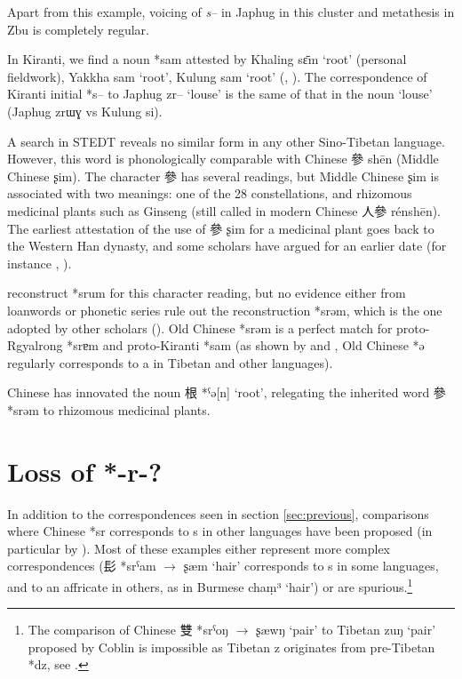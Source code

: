 \documentclass[oldfontcommands,oneside,a4paper,11pt]{article}
\newcommand{\ipa}[1]{{\phon #1}} %
\newcommand{\zh}[1]{{\cn #1}}
\newcommand{\archaic}[4]{\zh{#1} *\ipa{#2} $\rightarrow$ \ipa{#3} `#4'}
\begin{document}
Apart from this example, voicing of \textit{s--} in Japhug in this cluster and metathesis in Zbu is completely regular.

In Kiranti, we find a noun *\ipa{sam} attested by Khaling \ipa{sɛ̄m} `root' (personal fieldwork), Yakkha  \ipa{sam} `root', Kulung \ipa{sam} `root' (\citealt{kongren07yakkha}, \citealt{tolsma06kulung}). The correspondence of Kiranti initial *s--  to Japhug \ipa{zr--} `louse' is the same of that in the noun `louse' (Japhug \ipa{zrɯɣ} vs Kulung \ipa{si}).

A search in STEDT reveals no similar form in any other Sino-Tibetan language. However, this word is phonologically comparable with Chinese \zh{參} \ipa{shēn} (Middle Chinese \ipa{ʂim}). The character  \zh{參} has several readings, but Middle Chinese \ipa{ʂim} is associated with two meanings: one of the 28 constellations, and rhizomous medicinal plants such as Ginseng (still called in modern Chinese \zh{人參} \ipa{rénshēn}). The earliest attestation of the use of \zh{參} \ipa{ʂim} for a medicinal plant goes back to the Western Han dynasty, and some scholars have argued for an earlier date (for instance \citealt{xu11shen}, \citealt{sun92renshen}). 

 \citet[75]{bs14oc} reconstruct *\ipa{srum} for this character reading, but no evidence either from loanwords or phonetic series rule out the reconstruction *\ipa{srəm}, which is the one adopted by other scholars (\citealt{schuessler09minimal}). Old Chinese *\ipa{srəm} is a perfect match for proto-Rgyalrong *\ipa{srɐm} and proto-Kiranti *\ipa{sam} (as shown by \citealt{gong95st} and \citealt{hill12sixvowels}, Old Chinese *\ipa{ə} regularly corresponds to \ipa{a} in Tibetan and other languages).

Chinese has innovated the noun \zh{根} *\ipa{[k]ˁə[n]} `root', %
relegating the inherited word \zh{參} *\ipa{srəm} to rhizomous medicinal plants.

\section{Loss of *-r-?}
In addition to the correspondences seen in section \ref{sec:previous}, comparisons where Chinese *\ipa{sr} corresponds to \ipa{s} in other languages have been proposed (in particular by \citealt{coblin86handlist}). Most of these examples either represent more complex correspondences (\archaic{髟}{srˁam}{ʂæm}{hair} corresponds to \ipa{s} in some languages, and to an affricate in others, as in Burmese \ipa{chaṃ³} `hair') or are spurious.\footnote{The comparison of Chinese \archaic{雙}{srˁoŋ}{ʂæwŋ}{pair} to Tibetan \ipa{zuŋ} `pair' proposed by Coblin is impossible as Tibetan \ipa{z} originates from pre-Tibetan *\ipa{dz}, see \citet{hill14dz}. }
\end{document}
